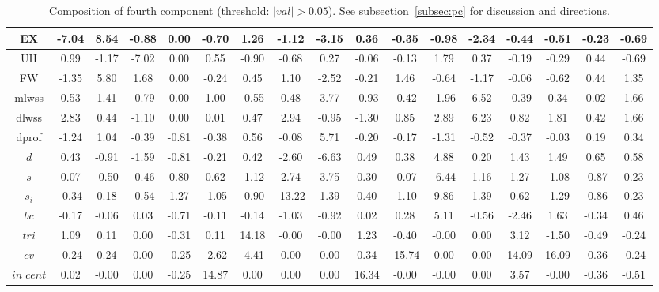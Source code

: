 \documentclass[%
 aip,
 jmp,%
 amsmath,amssymb,
 reprint,%
 floatfix,
]{revtex4-1}
\begin{document}
\begin{table}
\begin{tabular}{|c|| c|c|c|c|| c|c|c|c|| c|c|c|c|| c|c|c|c|}
EX & -7.04 & 8.54 & -0.88 & 0.00 & -0.70 & 1.26 & -1.12 & -3.15 & 0.36 & -0.35 & -0.98 & -2.34 & -0.44 & -0.51 & -0.23 & -0.69 \\\hline
UH & 0.99 & -1.17 & -7.02 & 0.00 & 0.55 & -0.90 & -0.68 & 0.27 & -0.06 & -0.13 & 1.79 & 0.37 & -0.19 & -0.29 & 0.44 & -0.69 \\\hline
FW & -1.35 & 5.80 & 1.68 & 0.00 & -0.24 & 0.45 & 1.10 & -2.52 & -0.21 & 1.46 & -0.64 & -1.17 & -0.06 & -0.62 & 0.44 & 1.35 \\\hline
mlwss & 0.53 & 1.41 & -0.79 & 0.00 & 1.00 & -0.55 & 0.48 & 3.77 & -0.93 & -0.42 & -1.96 & 6.52 & -0.39 & 0.34 & 0.02 & 1.66 \\\hline
dlwss & 2.83 & 0.44 & -1.10 & 0.00 & 0.01 & 0.47 & 2.94 & -0.95 & -1.30 & 0.85 & 2.89 & 6.23 & 0.82 & 1.81 & 0.42 & 1.66 \\\hline
dprof & -1.24 & 1.04 & -0.39 & -0.81 & -0.38 & 0.56 & -0.08 & 5.71 & -0.20 & -0.17 & -1.31 & -0.52 & -0.37 & -0.03 & 0.19 & 0.34 \\\hline
$d$ & 0.43 & -0.91 & -1.59 & -0.81 & -0.21 & 0.42 & -2.60 & -6.63 & 0.49 & 0.38 & 4.88 & 0.20 & 1.43 & 1.49 & 0.65 & 0.58 \\\hline
$s$ & 0.07 & -0.50 & -0.46 & 0.80 & 0.62 & -1.12 & 2.74 & 3.75 & 0.30 & -0.07 & -6.44 & 1.16 & 1.27 & -1.08 & -0.87 & 0.23 \\\hline
$s_i$ & -0.34 & 0.18 & -0.54 & 1.27 & -1.05 & -0.90 & -13.22 & 1.39 & 0.40 & -1.10 & 9.86 & 1.39 & 0.62 & -1.29 & -0.86 & 0.23 \\\hline
$bc$ & -0.17 & -0.06 & 0.03 & -0.71 & -0.11 & -0.14 & -1.03 & -0.92 & 0.02 & 0.28 & 5.11 & -0.56 & -2.46 & 1.63 & -0.34 & 0.46 \\\hline
$tri$ & 1.09 & 0.11 & 0.00 & -0.31 & 0.11 & 14.18 & -0.00 & -0.00 & 1.23 & -0.40 & -0.00 & 0.00 & 3.12 & -1.50 & -0.49 & -0.24 \\\hline
$cv$ & -0.24 & 0.24 & 0.00 & -0.25 & -2.62 & -4.41 & 0.00 & 0.00 & 0.34 & -15.74 & 0.00 & 0.00 & 14.09 & 16.09 & -0.36 & -0.24 \\\hline
$in\;cent$ & 0.02 & -0.00 & 0.00 & -0.25 & 14.87 & 0.00 & 0.00 & 0.00 & 16.34 & -0.00 & -0.00 & 0.00 & 3.57 & -0.00 & -0.36 & -0.51 \\\hline
\end{tabular}
  \caption{Composition of fourth component (threshold: $|val|>0.05$). See subsection~\ref{subsec:pc} for discussion and directions.}\label{tab:pca4}
\end{table}
\end{document}

